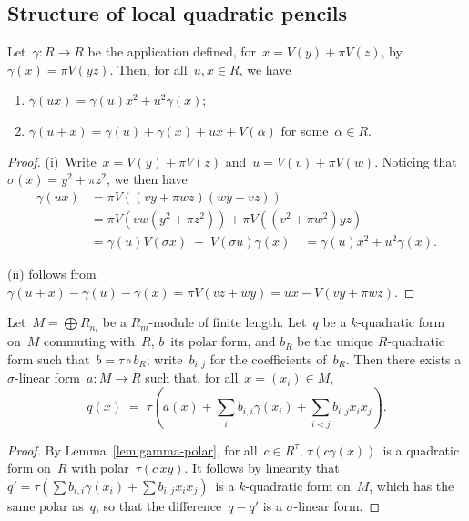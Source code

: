 \documentclass{article}%
\def\pa#1{\left(#1\right)}
\begin{document}
\subsection{Structure of local quadratic pencils}%

\begin{lem}\label{lem:gamma-polar}%
Let~$γ: R → R$ be the application defined, for~$x = V(y) + π V(z)$,
by~$γ(x) = π V(yz)$. Then, for all~$u, x ∈ R$, we have
\begin{enumerate}
\item $γ(ux) = γ(u) x^2 + u^2 γ(x)$;
\item $γ(u+x) = γ(u) + γ(x) + ux + V(α)$ for some~$α ∈ R$.
\end{enumerate}
\end{lem}


\begin{proof}
(i)~Write~$x = V(y) + π V(z)$ and~$u = V(v) + π V(w)$. Noticing
that~$σ(x) = y^2 + π z^2$, we then have
\begin{equation}\label{eq:gamma-prod}
\begin{split}
γ(ux) &= π V\pa{(vy + π wz)(wy+vz)}\\
 &= π V\pa{vw (y^2 + π z^2)} + π V \pa{(v^2+πw^2) yz}\\
 &= γ(u) V(σx) \;+\; V(σu) γ(x) \quad = γ(u) x^2 + u^2 γ(x).
\end{split}
\end{equation}

(ii) follows from
$γ(u+x) - γ(u) - γ(x) = π V(vz + wy) = ux - V(vy+πwz)$.
\end{proof}%

\begin{prop}\label{prop:quad-tau}%
Let~$M = ⨁ R_{n_i}$ be a $R_m$-module of finite length.
Let~$q$ be a $k$-quadratic form on~$M$ commuting with~$R$, $b$~its
polar form, and $b_R$ be the unique $R$-quadratic form such that~$b = τ ∘
b_R$; write~$b_{i,j}$ for the coefficients of~$b_R$.
Then there exists a $σ$-linear form~$a: M → R$ such that, for all~$x =
(x_i) ∈ M$,
\begin{equation}
q(x) \;=\; τ\pa{a(x) + ∑_{i} b_{i,i} γ(x_i) + ∑_{i < j} b_{i,j} x_i x_j}.
\end{equation}
\end{prop}

\begin{proof}
By Lemma~\ref{lem:gamma-polar}, for all~$c ∈ R^{τ}$,
$τ(c γ(x))$~is a quadratic form on~$R$ with polar~$τ(c\, xy)$.
It follows by linearity that
$q' = τ(∑ b_{i,i} γ(x_i) + ∑ b_{i,j} x_i x_j)$~is a $k$-quadratic form on~$M$,
which has the same polar as~$q$,
so that the difference~$q - q'$ is a $σ$-linear form.
\end{proof}%
\end{document}
